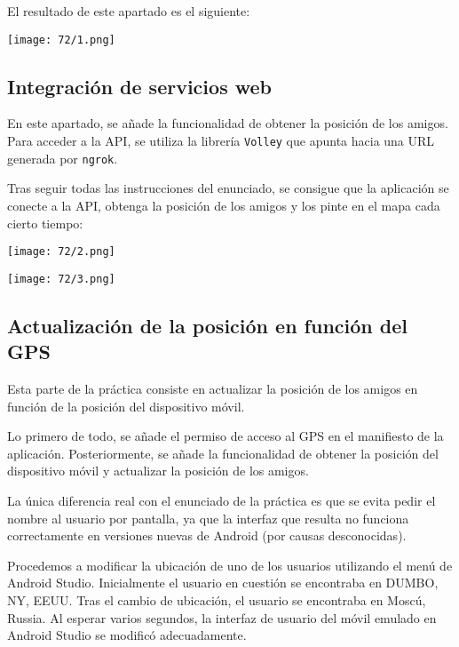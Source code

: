 El resultado de este apartado es el siguiente:

\begin{minipage}{\linewidth}
	\centering
	\texttt{[image: 72/1.png]}
	\label{fig:72/1}
\end{minipage}

\subsection{Integración de servicios web}
En este apartado, se añade la funcionalidad de obtener la posición de los amigos. Para acceder
a la API, se utiliza la librería \Verb#Volley# que apunta hacia una URL generada por \Verb#ngrok#.

Tras seguir todas las instrucciones del enunciado, se consigue que la aplicación se conecte a la API,
obtenga la posición de los amigos y los pinte en el mapa cada cierto tiempo:

\begin{minipage}{\linewidth}
	\centering
	\texttt{[image: 72/2.png]}
	\label{fig:72/2}
\end{minipage}

\begin{minipage}{\linewidth}
	\centering
	\texttt{[image: 72/3.png]}
	\label{fig:72/3}
\end{minipage}

\subsection{Actualización de la posición en función del GPS}
Esta parte de la práctica consiste en actualizar la posición de los amigos en función de la
posición del dispositivo móvil.

Lo primero de todo, se añade el permiso de acceso al GPS en el manifiesto de la aplicación.
Posteriormente, se añade la funcionalidad de obtener la posición del dispositivo móvil y
actualizar la posición de los amigos.

La única diferencia real con el enunciado de la práctica es que se evita pedir el nombre
al usuario por pantalla, ya que la interfaz que resulta no funciona correctamente en versiones
nuevas de Android (por causas desconocidas).

Procedemos a modificar la ubicación de uno de los usuarios utilizando el menú de Android Studio.
Inicialmente el usuario en cuestión se encontraba en DUMBO, NY, EEUU.
Tras el cambio de ubicación, el usuario se encontraba en Moscú, Russia.
Al esperar varios segundos, la interfaz de usuario del móvil emulado en Android Studio se modificó adecuadamente.

